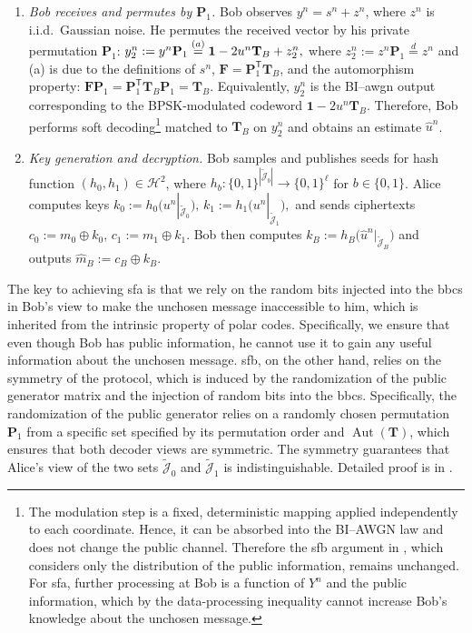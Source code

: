 \documentclass[onecolumn]{IEEEtran} %
\newcommand{\bP}{\mathbf P}
\newcommand{\bF}{\mathbf F}
\newcommand{\1}{\mathbbm{1}}
\DeclareMathOperator{\Aut}{Aut}
\theoremstyle{boldremark}
\newcommand{\bT}{\mathbf{T}}
\begin{document}
\begin{enumerate}
\item \textit{Bob receives and permutes by $\bP_1$.}
Bob observes \(y^n = s^n + z^n\), where \(z^n\) is i.i.d.\ Gaussian noise.
He permutes the received vector by his private permutation \(\bP_1\):
$y_2^n:= y^n \bP_1\overset{(a)}=\mathbf 1 - 2u^n\bT_B + z_2^n,\nolinebreak$
where \(z_2^n:=z^n\bP_1 \overset{d}= z^n\) and (a) is due to the definitions of $s^n$, \(\bF = \bP_1^{\mathsf T}\bT_B\), and the automorphism property: $\bF\bP_1 = \bP_1^{\mathsf T}\bT_B\bP_1 = \bT_B.$
Equivalently, \(y_2^n\) is the BI--\gls{awgn} output corresponding to the BPSK-modulated codeword
\(\mathbf 1 - 2u^n\bT_B\).
Therefore, Bob performs soft decoding\footnote{The modulation step is a fixed, deterministic mapping applied independently to each coordinate. Hence, it can be absorbed into the BI--AWGN law and does not change the public channel. Therefore the \gls{sfb} argument in \cite{PHL_OT}, which considers only the distribution of the public information, remains unchanged. For \gls{sfa}, further processing at Bob is a function of \(Y^n\) and the public information, which by the data-processing inequality cannot increase Bob's knowledge about the unchosen message.}
 matched to \(\bT_B\) on \(y_2^n\) and obtains an estimate \(\hat u^n\).

\item \textit{Key generation and decryption.}
  Bob samples and publishes seeds for hash function $(h_0,h_1)\in\mathcal{H}^2$, where $h_b:\{0,1\}^{|\tilde{\mathcal{J}}_b|}\to\{0,1\}^{\ell}$ for $b\in\{0,1\}$.
  Alice computes keys
$    k_0 := h_0\!\bigl(u^n|_{\tilde{\mathcal{J}}_{0}}\bigr),\,    k_1 := h_1\!\bigl(u^n|_{\tilde{\mathcal{J}}_{1}}\bigr),$
  and sends ciphertexts $    c_0 := m_0\oplus k_0,\, c_1 := m_1\oplus k_1.$
  Bob then computes $k_B := h_B\!\bigl(\hat u^n|_{\tilde{\mathcal{J}}_{B}}\bigr)$ and outputs
  $    \hat m_B := c_B\oplus k_B.$
\end{enumerate}

The key to achieving \gls{sfa} is that we rely on the random bits injected into the \gls{bbcs} in Bob's view to make the unchosen message inaccessible to him, which is inherited from the intrinsic property of polar codes. Specifically, we ensure that even though Bob has public information, he cannot use it to gain any useful information about the unchosen message. \gls{sfb}, on the other hand, relies on the symmetry of the protocol, which is induced by the randomization of the public generator matrix and the injection of random bits into the \gls{bbcs}. Specifically, the randomization of the public generator relies on a randomly chosen permutation \(\mathbf{P}_1\) from a specific set specified by its permutation order and \(\Aut(\mathbf{T})\), which ensures that both decoder views are symmetric. The symmetry guarantees that Alice’s view of the two sets $\tilde{\mathcal{J}}_{0}$ and $\tilde{\mathcal{J}}_{1}$ is indistinguishable. Detailed proof is in \cite[Theorem 2]{PHL_OT}.
\end{document}
